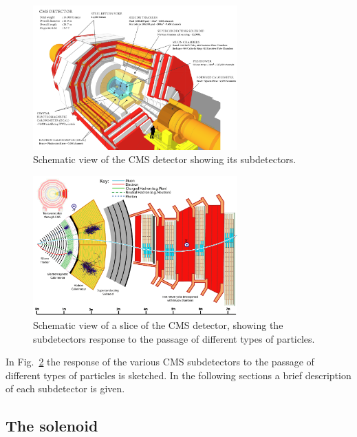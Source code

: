 \begin{figure}[htb]
\centering
\includegraphics[width=0.7\textwidth]{images/CMS.pdf}
\caption{Schematic view of the CMS detector showing its subdetectors.}\label{fig:CMS}
\end{figure}
\begin{figure}[htb]
\centering
\includegraphics[width=0.7\textwidth]{images/CMSslice.png}
\caption{Schematic view of a slice of the CMS detector, showing the subdetectors response to the passage of different types of particles.}\label{fig:CMSslice}
\end{figure}

In Fig.~\ref{fig:CMSslice} the response of the various CMS subdetectors to the passage of different types of particles is sketched. In the following sections a brief description of each subdetector is given.

\subsection{The solenoid}

